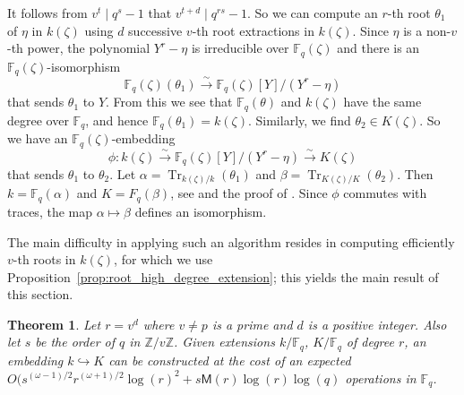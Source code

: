 \documentclass{mcom-l}
\theoremstyle{plain}
\newtheorem{theorem}{Theorem}
\theoremstyle{definition}
\DeclareMathOperator{\trace}{Tr} %
\newcommand{\Z}{\ensuremath{\mathbb{Z}}}
\newcommand{\F}{\ensuremath{\mathbb{F}}}
\newcommand{\MM}{\ensuremath{\mathsf{M}}}
\newcounter{algorithm}
\begin{document}
It follows from $v^t \mid q^s - 1$ that $v^{t + d} \mid q^{rs} - 1$. So we can compute an $r$-th 
root $\theta_1$ of $\eta$ in $k(\zeta)$ using $d$ successive $v$-th root extractions in $k(\zeta)$. 
Since $\eta$ is a non-$v$-th power, the polynomial $Y^r - \eta$ is irreducible over $\F_q(\zeta)$ 
and there is an $\F_q(\zeta)$-isomorphism 
\[ \F_q(\zeta)(\theta_1) \xrightarrow{\sim} \F_q(\zeta)[Y] / (Y^r - \eta) \]
that sends $\theta_1$ to $Y$. From this we see that $\F_q(\theta)$ and $k(\zeta)$ have the same 
degree over $\F_q$, and hence $\F_q(\theta_1) = k(\zeta)$. Similarly, we find $\theta_2 \in 
K(\zeta)$. So we have an $\F_q(\zeta)$-embedding
\[ \phi: k(\zeta) \xrightarrow{\sim} \F_q(\zeta)[Y] / (Y^r - \eta) \xrightarrow{\sim} K(\zeta) \]
that sends $\theta_1$ to $\theta_2$. Let $\alpha = \trace_{k(\zeta) / k}(\theta_1)$ and $\beta = 
\trace_{K(\zeta) / K}(\theta_2)$. Then $k = \F_q(\alpha)$ and $K = F_q(\beta)$, see \cite[Algorithm 
13]{shoup93} and the proof of \cite[Theorem 2.1]{Shoup90}. Since $\phi$ commutes with traces, the 
map $\alpha\mapsto\beta$ defines an isomorphism.

The main difficulty in applying such an algorithm resides in computing efficiently $v$-th roots in 
$k(\zeta)$, for which we use Proposition~\ref{prop:root_high_degree_extension}; this yields the 
main result of this section.
\begin{theorem}
	\label{theorem:isom-root}
	Let $r = v^d$ where $v \ne p$ is a prime and $d$ is a positive integer. Also let $s$ be the 
	order of $q$ in $\Z / v\Z$. Given extensions $k/\F_q$, $K/\F_q$ of degree $r$, an
        embedding $k\hookrightarrow K$ can be constructed at the cost of 
an expected $O(s^{(\omega-1)/2}r^{(\omega+1)/2}\log(r)^2 + s\MM(r)\log(r)\log(q)$
operations in $\F_q$.
\end{theorem}
\end{document}
